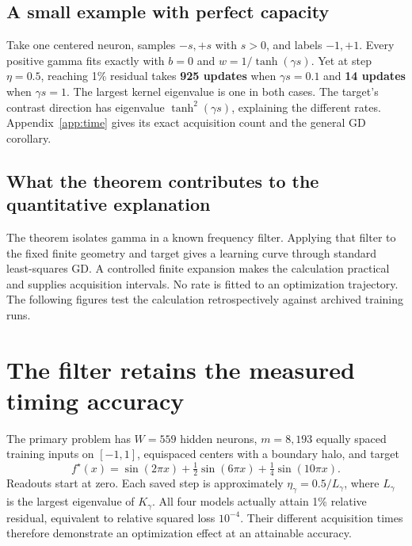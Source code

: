 \documentclass[11pt]{article}
\theoremstyle{definition}
\begin{document}
\subsection*{A small example with perfect capacity}
Take one centered neuron, samples $-s,+s$ with $s>0$, and labels $-1,+1$.
Every positive gamma fits exactly with $b=0$ and $w=1/\tanh(\gamma s)$.
Yet at step $\eta=0.5$, reaching 1\% residual takes \textbf{925 updates}
when $\gamma s=0.1$ and \textbf{14 updates} when $\gamma s=1$.
The largest kernel eigenvalue is one in both cases. The target's contrast
direction has eigenvalue $\tanh^2(\gamma s)$, explaining the different
rates. Appendix~\ref{app:time} gives its exact acquisition count and the
general GD corollary.

\subsection*{What the theorem contributes to the quantitative explanation}
The theorem isolates gamma in a known frequency filter. Applying that filter
to the fixed finite geometry and target gives a learning curve through
standard least-squares GD. A controlled finite expansion makes the calculation
practical and supplies acquisition intervals. No rate is fitted to an
optimization trajectory. The following figures test the calculation
retrospectively against archived training runs.

\clearpage
\section{The filter retains the measured timing accuracy}
The primary problem has $W=559$ hidden neurons, $m=8{,}193$ equally spaced
training inputs on $[-1,1]$, equispaced centers with a boundary halo, and target
\begin{equation}\label{eq:target}
 f^\star(x)=\sin(2\pi x)+\tfrac12\sin(6\pi x)+\tfrac14\sin(10\pi x).
\end{equation}
Readouts start at zero. Each saved step is approximately $\eta_\gamma=0.5/L_\gamma$,
where $L_\gamma$ is the largest eigenvalue of $K_\gamma$. All four models
actually attain 1\% relative residual, equivalent to relative squared loss
$10^{-4}$. Their different acquisition times therefore demonstrate an
optimization effect at an attainable accuracy.
\end{document}
